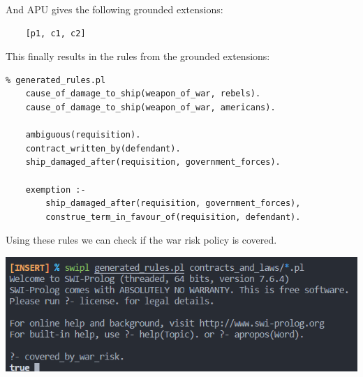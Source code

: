 And APU gives the following grounded extensions:

\begin{verbatim}
    [p1, c1, c2]
\end{verbatim}

This finally results in the rules from the grounded extensions:

\begin{verbatim}
% generated_rules.pl
    cause_of_damage_to_ship(weapon_of_war, rebels).
    cause_of_damage_to_ship(weapon_of_war, americans).
    
    ambiguous(requisition).
    contract_written_by(defendant).
    ship_damaged_after(requisition, government_forces).
    
    exemption :-
        ship_damaged_after(requisition, government_forces),
        construe_term_in_favour_of(requisition, defendant).
\end{verbatim}

Using these rules we can check if the war risk policy is covered.

\includegraphics{figures/result.png}

\FloatBarrier